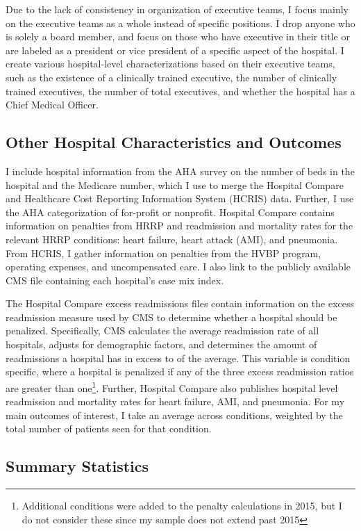 \documentclass[12pt]{article}
\begin{document}
    Due to the lack of consistency in organization of executive teams, I focus mainly on the executive teams as a whole instead of specific positions. I drop anyone who is solely a board member, and focus on those who have executive in their title or are labeled as a president or vice president of a specific aspect of the hospital. I create various hospital-level characterizations based on their executive teams, such as the existence of a clinically trained executive, the number of clinically trained executives, the number of total executives, and whether the hospital has a Chief Medical Officer.


    \subsection{Other Hospital Characteristics and Outcomes}

    I include hospital information from the AHA survey on the number of beds in the hospital and the Medicare number, which I use to merge the Hospital Compare and Healthcare Cost Reporting Information System (HCRIS) data. Further, I use the AHA categorization of for-profit or nonprofit. Hospital Compare contains information on penalties from HRRP and readmission and mortality rates for the relevant HRRP conditions: heart failure, heart attack (AMI), and pneumonia. From HCRIS, I gather information on penalties from the HVBP program, operating expenses, and uncompensated care. I also link to the publicly available CMS file containing each hospital's case mix index.

    The Hospital Compare excess readmissions files contain information on the excess readmission measure used by CMS to determine whether a hospital should be penalized. Specifically, CMS calculates the average readmission rate of all hospitals, adjusts for demographic factors, and determines the amount of readmissions a hospital has in excess to of the average. This variable is condition specific, where a hospital is penalized if any of the three excess readmission ratios are greater than one\footnote{Additional conditions were added to the penalty calculations in 2015, but I do not consider these since my sample does not extend past 2015}. Further, Hospital Compare also publishes hospital level readmission and mortality rates for heart failure, AMI, and pneumonia. For my main outcomes of interest, I take an average across conditions, weighted by the total number of patients seen for that condition.

    \subsection{Summary Statistics}
\end{document}
